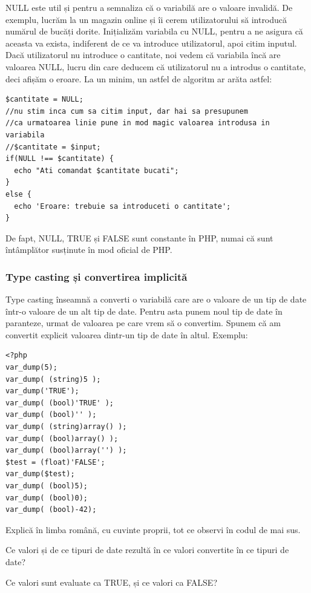 NULL este util și pentru a semnaliza că o variabilă are o valoare invalidă.
De exemplu, lucrăm la un magazin online și îi cerem utilizatorului să
introducă numărul de bucăți dorite. Inițializăm variabila cu NULL,
pentru a ne asigura că aceasta va exista, indiferent de ce va introduce
utilizatorul, apoi
citim inputul. Dacă utilizatorul nu introduce o cantitate, noi vedem că
variabila încă are valoarea NULL, lucru din care deducem că utilizatorul
nu a introdus o cantitate, deci afișăm o eroare. La un minim, un astfel
de algoritm ar arăta astfel:
\begin{lstlisting}
$cantitate = NULL;
//nu stim inca cum sa citim input, dar hai sa presupunem
//ca urmatoarea linie pune in mod magic valoarea introdusa in variabila
//$cantitate = $input;
if(NULL !== $cantitate) {
  echo "Ati comandat $cantitate bucati";
}
else {
  echo 'Eroare: trebuie sa introduceti o cantitate';
}
\end{lstlisting}

De fapt, NULL, TRUE și FALSE sunt constante în PHP, numai că sunt
{\glqq}întâmplător{\grqq} susținute în mod {\glqq}oficial{\grqq} de PHP.

\subsubsection{Type casting și convertirea implicită}
Type casting înseamnă a converti o variabilă care are o valoare
de un tip de date într-o valoare de un alt tip de date. Pentru asta
punem noul tip de date în paranteze, urmat de valoarea pe care vrem
să o convertim. Spunem că am convertit explicit valoarea dintr-un tip
de date în altul. Exemplu:
\begin{lstlisting}[label=lst:typecasting,caption=Type casting explicit]
<?php
var_dump(5);
var_dump( (string)5 );
var_dump('TRUE');
var_dump( (bool)'TRUE' );
var_dump( (bool)'' );
var_dump( (string)array() );
var_dump( (bool)array() );
var_dump( (bool)array('') );
$test = (float)'FALSE';
var_dump($test);
var_dump( (bool)5);
var_dump( (bool)0);
var_dump( (bool)-42);
\end{lstlisting}

\begin{Exercise}[title={Observații type casting},difficulty=1]
Explică în limba română, cu cuvinte proprii, tot ce observi în codul de mai sus.

Ce valori și de ce tipuri de date rezultă în ce valori convertite în ce
tipuri de date?

Ce valori sunt evaluate ca TRUE, și ce valori ca FALSE?
\end{Exercise}

